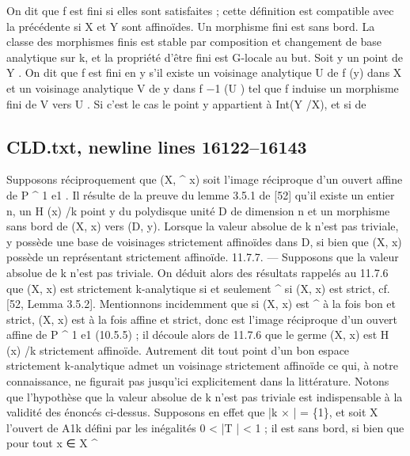 \documentclass[
  10pt,
]{article}
\newenvironment{Shaded}{}{}
\newcommand{\NormalTok}[1]{#1}
\begin{document}
\begin{Shaded}
\begin{Highlighting}[]
\NormalTok{On dit que f est fini si elles sont satisfaites ; cette définition est compatible avec la}
\NormalTok{précédente si X et Y sont affinoïdes. Un morphisme fini est sans bord.}
\NormalTok{  La classe des morphismes finis est stable par composition et changement de base}
\NormalTok{analytique sur k, et la propriété d’être fini est G{-}locale au but.}
\NormalTok{  Soit y un point de Y . On dit que f est fini en y s’il existe un voisinage analytique}
\NormalTok{U de f (y) dans X et un voisinage analytique V de y dans f −1 (U ) tel que f induise un}
\NormalTok{morphisme fini de V vers U . Si c’est le cas le point y appartient à Int(Y /X), et si de}
\end{Highlighting}
\end{Shaded}

\subsection{CLD.txt, newline lines
16122--16143}\label{cld.txt-newline-lines-1612216143}

\begin{Shaded}
\begin{Highlighting}[]
\NormalTok{  Supposons réciproquement que (X, \^{}   x) soit l’image réciproque d’un ouvert affine de}
\NormalTok{P \^{} 1 e1 . Il résulte de la preuve du lemme 3.5.1 de [52] qu’il existe un entier n, un}
\NormalTok{ H (x) /k}
\NormalTok{point y du polydisque unité D de dimension n et un morphisme sans bord de (X, x) vers}
\NormalTok{(D, y). Lorsque la valeur absolue de k n’est pas triviale, y possède une base de voisinages}
\NormalTok{strictement affinoïdes dans D, si bien que (X, x) possède un représentant strictement}
\NormalTok{affinoïde.}
\NormalTok{11.7.7. — Supposons que la valeur absolue de k n’est pas triviale. On déduit alors}
\NormalTok{des résultats rappelés au 11.7.6 que (X, x) est strictement k{-}analytique si et seulement}
\NormalTok{   \^{}}
\NormalTok{si (X, x) est strict, cf. [52, Lemma 3.5.2]. Mentionnons incidemment que si (X, x) est}
\NormalTok{                         \^{}}
\NormalTok{à la fois bon et strict, (X, x) est à la fois affine et strict, donc est l’image réciproque}
\NormalTok{d’un ouvert affine de P \^{} 1 e1 (10.5.5) ; il découle alors de 11.7.6 que le germe (X, x) est}
\NormalTok{                        H (x) /k}
\NormalTok{strictement affinoïde. Autrement dit tout point d’un bon espace strictement k{-}analytique}
\NormalTok{admet un voisinage strictement affinoïde ce qui, à notre connaissance, ne figurait pas}
\NormalTok{jusqu’ici explicitement dans la littérature.}
\NormalTok{   Notons que l’hypothèse que la valeur absolue de k n’est pas triviale est indispensable}
\NormalTok{à la validité des énoncés ci{-}dessus. Supposons en effet que |k × | = \{1\}, et soit X l’ouvert}
\NormalTok{de A1k défini par les inégalités 0 \textless{} |T | \textless{} 1 ; il est sans bord, si bien que pour tout x ∈ X}
\NormalTok{              \^{}}
\end{Highlighting}
\end{Shaded}
\end{document}
